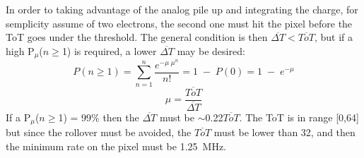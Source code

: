    In order to taking advantage of the analog pile up and integrating the charge, for semplicity assume of two electrons, the second one must hit the pixel before the ToT goes under the threshold. The general condition is then $\overline{\Delta T}<\overline{ToT}$, but if a high P$_\mu$($n\geqslant$1) is required, a lower $\overline{\Delta T}$ may be desired:
   \begin{equation}
      P(n\geqslant1) = \sum\limits_{n=1}^n \frac{e^{-\mu\;\mu^n}}{n!} = 1\;-\;P(0) = 1\;-\;e^{-\mu}
   \end{equation}
   \begin{equation}
      \mu = \frac{\overline{ToT}}{\overline{\Delta T}}
   \end{equation}
   If a P$_\mu$($n\geqslant$1) = 99\% then the $\overline{\Delta T}$ must be $\sim$0.22$\overline{ToT}$. The ToT is in range [0,64] but since the rollover must be avoided, the $\overline{ToT}$ must be lower than 32, and then the minimum rate on the pixel must be \SI{1.25}{\MHz}. \\   

